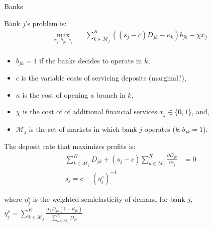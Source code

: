\documentclass[notes,10pt, aspectratio=169]{beamer}
\newenvironment{wideitemize}{\itemize\addtolength{\itemsep}{10pt}}{\enditemize}
\begin{document}
\begin{frame}{Banks}

    \begin{wideitemize}
    \item Bank $j$'s problem is: 
    \begin{equation}
    \begin{aligned}
        \max _{x_j, b_{jk},s_j} & \quad \sum_{k\in\mathcal{M}_j}^K ((s_j-c)D_{jk} - \kappa_k)b_{jk} - \chi x_j  \\
        \end{aligned}
    \end{equation}

    \begin{itemize}
        \item $b_{jk}=1$ if the banks decides to operate in $k$,
        \item $c$ is the variable costs of servicing deposits (marginal?),
        \item $\kappa$ is the cost of opening a branch in $k$,
        \item $\chi$ is the cost of of additional financial services $x_j \in \{0,1\}$, and,
        \item $\mathcal{M}_j$ is the set of markets in which bank $j$ operates ($k: b_{jk}=1$).
    \end{itemize}
    \pause
    \item The deposit rate that maximizes profits is:
        \begin{equation}
            \begin{align}
        \sum_{k\in\mathcal{M}_j}^K D_{jk} + (s_j-c)   \sum_{k\in\mathcal{M}_j}^K \frac{\partial D_{jk}}{\partial s_j} &= 0 \\
 s_j = c -(\eta_j^s)^{-1} 
        \end{align}
        \end{equation}

    \item where $\eta_j^s$ is the weighted semielasticity of demand for bank $j$, $\eta_j^s = \sum_{k\in\mathcal{M}_j}^K \frac{\alpha_k D_{jk} (1-d_{jk})}{\sum_{k\in\mathcal{M}_j}^K D_{jk}}$.
        \end{wideitemize}
    
\end{frame}
\end{document}
